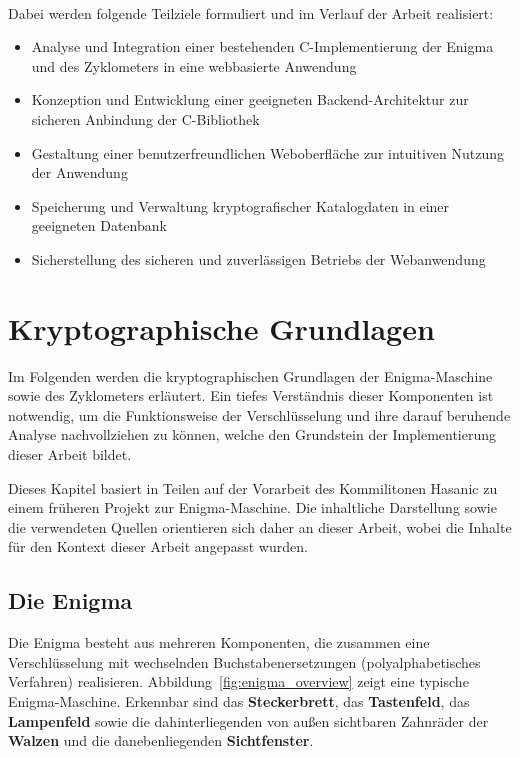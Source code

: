 \documentclass[12pt, ngerman, a4paper, numbers=noenddot]{article}
\begin{document}
\ \\
Dabei werden folgende Teilziele formuliert und im Verlauf der Arbeit realisiert:

\begin{itemize}
	\item Analyse und Integration einer bestehenden C-Implementierung der Enigma und des Zyklometers in eine webbasierte Anwendung
	\item Konzeption und Entwicklung einer geeigneten Backend-Architektur zur sicheren Anbindung der C-Bibliothek
	\item Gestaltung einer benutzerfreundlichen Weboberfläche zur intuitiven Nutzung der Anwendung
	\item Speicherung und Verwaltung kryptografischer Katalogdaten in einer geeigneten Datenbank
	\item Sicherstellung des sicheren und zuverlässigen Betriebs der Webanwendung
\end{itemize}





\newpage
\section{Kryptographische Grundlagen}

Im Folgenden werden die kryptographischen Grundlagen der Enigma-Maschine sowie des Zyklometers erläutert. Ein tiefes Verständnis dieser Komponenten ist notwendig, um die Funktionsweise der Verschlüsselung und ihre darauf beruhende Analyse nachvollziehen zu können, welche den Grundstein der Implementierung dieser Arbeit bildet.

Dieses Kapitel basiert in Teilen auf der Vorarbeit des Kommilitonen Hasanic zu einem früheren Projekt zur Enigma-Maschine. Die inhaltliche Darstellung sowie die verwendeten Quellen orientieren sich daher an dieser Arbeit, wobei die Inhalte für den Kontext dieser Arbeit angepasst wurden.


\subsection{Die Enigma}


Die Enigma besteht aus mehreren Komponenten, die zusammen eine Verschlüsselung mit wechselnden Buchstabenersetzungen (polyalphabetisches Verfahren) realisieren. Abbildung~\ref{fig:enigma_overview} zeigt eine typische Enigma-Maschine. Erkennbar sind das \textbf{Steckerbrett}, das \textbf{Tastenfeld}, das \textbf{Lampenfeld} sowie die dahinterliegenden von außen sichtbaren Zahnräder der \textbf{Walzen} und die danebenliegenden \textbf{Sichtfenster}.
\end{document}
